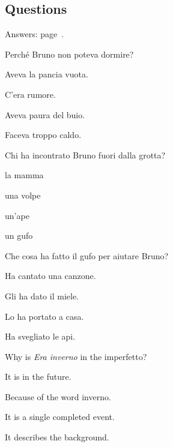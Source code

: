 \documentclass[11pt,a4paper,twoside,openright]{book}
\begin{document}
\subsection*{Questions}\label{story:lorso-che-non-poteva-dormire:questions}
{\color{muted}\small Answers: page~\pageref{ans:story:lorso-che-non-poteva-dormire}.}

\begin{exercises}
\item\label{ex:story-orso-1}\relax Perché Bruno non poteva dormire?\par\nopagebreak\begin{options}
\item\relax Aveva la pancia vuota.
\item\relax C'era rumore.
\item\relax Aveva paura del buio.
\item\relax Faceva troppo caldo.
\end{options}
\item\label{ex:story-orso-2}\relax Chi ha incontrato Bruno fuori dalla grotta?\par\nopagebreak\begin{options}
\item\relax la mamma
\item\relax una volpe
\item\relax un'ape
\item\relax un gufo
\end{options}
\item\label{ex:story-orso-3}\relax Che cosa ha fatto il gufo per aiutare Bruno?\par\nopagebreak\begin{options}
\item\relax Ha cantato una canzone.
\item\relax Gli ha dato il miele.
\item\relax Lo ha portato a casa.
\item\relax Ha svegliato le api.
\end{options}
\item\label{ex:story-orso-4}\relax Why is \textit{Era inverno} in the imperfetto?\par\nopagebreak\begin{options}
\item\relax It is in the future.
\item\relax Because of the word inverno.
\item\relax It is a single completed event.
\item\relax It describes the background.

\end{options}
\end{exercises}
\end{document}
